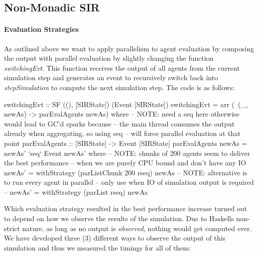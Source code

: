 \subsection{Non-Monadic SIR}
\label{parallel_nonmonadic_sir}

\paragraph{Evaluation Strategies}
As outlined above we want to apply parallelism to agent evaluation by composing the output with parallel evaluation by slightly changing the function \textit{switchingEvt}. This function receives the output of all agents from the current simulation step and generates an event to recursively switch back into \textit{stepSimulation} to compute the next simulation step. The code is as follows:

\begin{HaskellCode}
switchingEvt :: SF ((), [SIRState]) (Event [SIRState])
switchingEvt = arr (\ (_, newAs) -> parEvalAgents newAs)
  where
    -- NOTE: need a seq here otherwise would lead to GC'd sparks because
    -- the main thread consumes the output already when aggregating, so using seq 
    -- will force parallel evaluation at that point 
    parEvalAgents :: [SIRState] -> Event [SIRState]
    parEvalAgents newAs = newAs' `seq` Event newAs' 
      where
        -- NOTE: chunks of 200 agents seem to deliver the best performance
        -- when we are purely CPU bound and don't have any IO
        newAs' = withStrategy (parListChunk 200 rseq) newAs
        -- NOTE: alternative is to run every agent in parallel
        -- only use when IO of simulation output is required
        -- newAs' = withStrategy (parList rseq) newAs
\end{HaskellCode}

Which evaluation strategy resulted in the best performance increase turned out to depend on how we observe the results of the simulation. Due to Haskells non-strict nature, as long as no output is \textit{observed}, nothing would get computed ever. We have developed three (3) different ways to observe the output of this simulation and thus we measured the timings for all of them:

